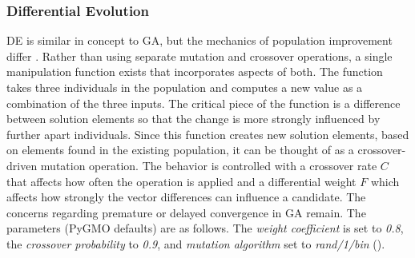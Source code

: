\documentclass{tamuccthesis}
\begin{document}
\subsubsection{Differential Evolution }

DE is similar in concept to GA, but the mechanics of population improvement differ \cite{de:zhang:2013}. Rather than using separate mutation and crossover operations, a single manipulation function exists that incorporates aspects of both. The function takes three individuals in the population and computes a new value as a combination of the three inputs. The critical piece of the function is a difference between solution elements so that the change is more strongly influenced by further apart individuals. Since this function creates new solution elements, based on elements found in the existing population, it can be thought of as a crossover-driven mutation operation. The behavior is controlled with a crossover rate $C$ that affects how often the operation is applied and a differential weight $F$ which affects how strongly the vector differences can influence a candidate. The concerns regarding premature or delayed convergence in GA remain. The parameters (PyGMO defaults) are as follows. The \textit{weight coefficient} is set to \textit{0.8}, the \textit{crossover probability} to \textit{0.9}, and \textit{mutation algorithm} set to \textit{rand/1/bin} (\cite{de:neri:2010}). 
\end{document}
